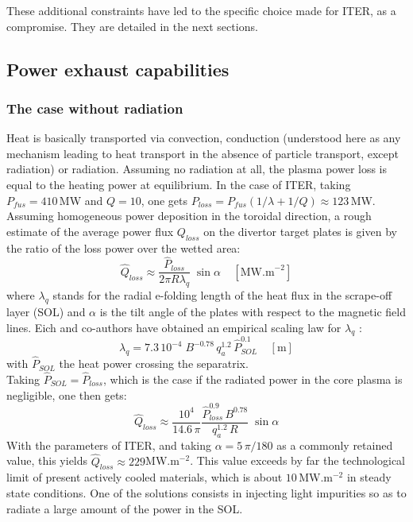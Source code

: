 These additional constraints have led to the specific choice made for ITER, as a compromise. They are detailed in the next sections.


\subsection{Power exhaust capabilities}
\label{sec:power_exhaust}

\subsubsection*{The case without radiation}

Heat is basically transported via convection, conduction (understood here as any mechanism leading to heat transport in the absence of particle transport, except radiation) or radiation. 
Assuming no radiation at all, the plasma power loss is equal to the heating power at equilibrium. In the case of ITER, taking $P_{fus}=410\,$MW and $Q=10$, one gets $P_{loss} = P_{fus}(1/\lambda + 1/Q) \approx 123\,$MW. \\

Assuming homogeneous power deposition in the toroidal direction, a rough estimate of the average power flux $Q_{loss}$ on the divertor target plates is given by the ratio of the loss power over the wetted area:
\begin{equation}
  \hat Q_{loss} \approx \frac{\hat P_{loss}}{2\pi R \lambda_q} \;\sin\alpha \;\;\;\; [\textrm{MW.m}^{-2}]
\end{equation}
where $\lambda_q$ stands for the radial e-folding length of the heat flux in the scrape-off layer (SOL) and $\alpha$ is the tilt angle of the plates with respect to the magnetic field lines.
Eich and co-authors have obtained an empirical scaling law for $\lambda_q$ \cite{Eich2011,Eich2013}:
\begin{equation}
  \lambda_q = 7.3\,10^{-4}\; B^{-0.78} \, q_{a}^{1.2} \, \hat P_{SOL}^{0.1}\;\;\;\; [\textrm{m}]
\end{equation}
with $\hat P_{SOL}$ the heat power crossing the separatrix.\\

Taking $\hat P_{SOL} = \hat P_{loss}$, which is the case if the radiated power in the core plasma is negligible, one then gets:
\begin{equation*}
  \hat Q_{loss} \approx \frac{10^4}{14.6\, \pi} 
    \frac{\hat P_{loss}^{0.9} \, B^{0.78}}{q_a^{1.2} \, R} \;\sin\alpha
\end{equation*}
With the parameters of ITER, and taking $\alpha = 5\, \pi/180$ as a commonly retained value, this yields $\hat Q_{loss} \approx 229$MW.m$^{-2}$. This value exceeds by far the technological limit of present actively cooled materials, which is about $10\,$MW.m$^{-2}$ in steady state conditions. One of the solutions consists in injecting light impurities so as to radiate a large amount of the power in the SOL.

